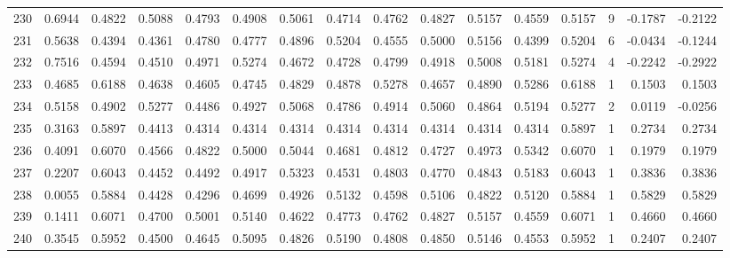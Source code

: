 \begin{tabular}{lrrrrrrrrrrrrrrr}
230 &      0.6944 &  0.4822 &  0.5088 &  0.4793 &  0.4908 &  0.5061 &  0.4714 &  0.4762 &  0.4827 &  0.5157 &   0.4559 &     0.5157 &      9 &                   -0.1787 &                    -0.2122 \\
231 &      0.5638 &  0.4394 &  0.4361 &  0.4780 &  0.4777 &  0.4896 &  0.5204 &  0.4555 &  0.5000 &  0.5156 &   0.4399 &     0.5204 &      6 &                   -0.0434 &                    -0.1244 \\
232 &      0.7516 &  0.4594 &  0.4510 &  0.4971 &  0.5274 &  0.4672 &  0.4728 &  0.4799 &  0.4918 &  0.5008 &   0.5181 &     0.5274 &      4 &                   -0.2242 &                    -0.2922 \\
233 &      0.4685 &  0.6188 &  0.4638 &  0.4605 &  0.4745 &  0.4829 &  0.4878 &  0.5278 &  0.4657 &  0.4890 &   0.5286 &     0.6188 &      1 &                    0.1503 &                     0.1503 \\
234 &      0.5158 &  0.4902 &  0.5277 &  0.4486 &  0.4927 &  0.5068 &  0.4786 &  0.4914 &  0.5060 &  0.4864 &   0.5194 &     0.5277 &      2 &                    0.0119 &                    -0.0256 \\
235 &      0.3163 &  0.5897 &  0.4413 &  0.4314 &  0.4314 &  0.4314 &  0.4314 &  0.4314 &  0.4314 &  0.4314 &   0.4314 &     0.5897 &      1 &                    0.2734 &                     0.2734 \\
236 &      0.4091 &  0.6070 &  0.4566 &  0.4822 &  0.5000 &  0.5044 &  0.4681 &  0.4812 &  0.4727 &  0.4973 &   0.5342 &     0.6070 &      1 &                    0.1979 &                     0.1979 \\
237 &      0.2207 &  0.6043 &  0.4452 &  0.4492 &  0.4917 &  0.5323 &  0.4531 &  0.4803 &  0.4770 &  0.4843 &   0.5183 &     0.6043 &      1 &                    0.3836 &                     0.3836 \\
238 &      0.0055 &  0.5884 &  0.4428 &  0.4296 &  0.4699 &  0.4926 &  0.5132 &  0.4598 &  0.5106 &  0.4822 &   0.5120 &     0.5884 &      1 &                    0.5829 &                     0.5829 \\
239 &      0.1411 &  0.6071 &  0.4700 &  0.5001 &  0.5140 &  0.4622 &  0.4773 &  0.4762 &  0.4827 &  0.5157 &   0.4559 &     0.6071 &      1 &                    0.4660 &                     0.4660 \\
240 &      0.3545 &  0.5952 &  0.4500 &  0.4645 &  0.5095 &  0.4826 &  0.5190 &  0.4808 &  0.4850 &  0.5146 &   0.4553 &     0.5952 &      1 &                    0.2407 &                     0.2407 \\

\end{tabular}
